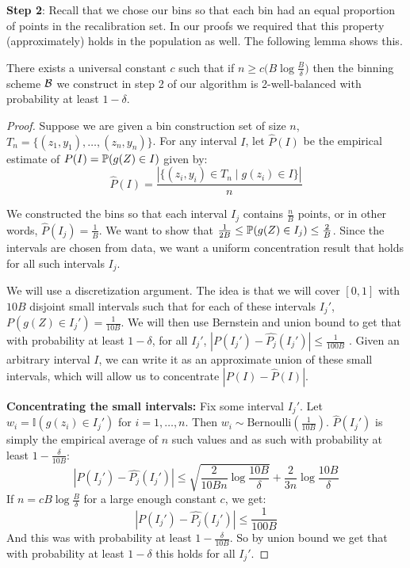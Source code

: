 \textbf{Step 2}: Recall that we chose our bins so that each bin had an equal proportion of points in the recalibration set. In our proofs we required that this property (approximately) holds in the population as well. The following lemma shows this.

\begin{lemma}
\label{lem:well-balanced}
There exists a universal constant $c$ such that if $n \geq c \big( B \log{\frac{B}{\delta}} \big)$ then the binning scheme $\mathcal{B}{}$ we construct in step 2 of our algorithm is 2-well-balanced with probability at least $1 - \delta$.
\end{lemma}

\begin{proof}
Suppose we are given a bin construction set of size $n$, $T_n = \{(z_1, y_1), \dots, (z_n, y_n)\}$.
For any interval $I$, let $\hat{P}(I)$ be the empirical estimate of $P(I) = \mathbb{P}(g(Z) \in I)$ given by:
\[ \hat{P}(I) = \frac{|\{(z_i, y_i) \in T_n \mid g(z_i) \in I\}|}{n} \]

We constructed the bins so that each interval $I_j$ contains $\frac{n}{B}$ points, or in other words, $\hat{P}(I_j) = \frac{1}{B}$. We want to show that $\frac{1}{2B} \leq \mathbb{P}(g(Z) \in I_j) \leq \frac{2}{B}$. Since the intervals are chosen from data, we want a uniform concentration result that holds for all such intervals $I_j$.

We will use a discretization argument. The idea is that we will cover $[0, 1]$ with $10B$ disjoint small intervals such that for each of these intervals $I_j'$, $P(g(Z) \in I_j') = \frac{1}{10B}$. We will then use Bernstein and union bound to get that with probability at least $1 - \delta$, for all $I_j'$, $|P(I_j') - \hat{P_j}(I_j')| \leq \frac{1}{100B}$ . Given an arbitrary interval $I$, we can write it as an approximate union of these small intervals, which will allow us to concentrate $|P(I) - \hat{P}(I)|$.

\textbf{Concentrating the small intervals:} Fix some interval $I_j'$. Let $w_i = \mathbb{I}(g(z_i) \in I_j')$ for $i = 1,\dots,n$. Then $w_i \sim \mbox{Bernoulli}(\frac{1}{10B})$. $\hat{P}(I_j')$ is simply the empirical average of $n$ such values and as such with probability at least $1 - \frac{\delta}{10B}$:
\[ |P(I_j') - \hat{P_j}(I_j')| \leq \sqrt{\frac{2}{10Bn} \log{\frac{10B}{\delta}}} + \frac{2}{3n} \log{\frac{10B}{\delta}} \]
If $n = cB \log{\frac{B}{\delta}}$ for a large enough constant $c$, we get:
\[ |P(I_j') - \hat{P_j}(I_j')| \leq \frac{1}{100B} \]
And this was with probability at least $1 - \frac{\delta}{10B}$. So by union bound we get that with probability at least $1 - \delta$ this holds for all $I_j'$.


\end{proof}
